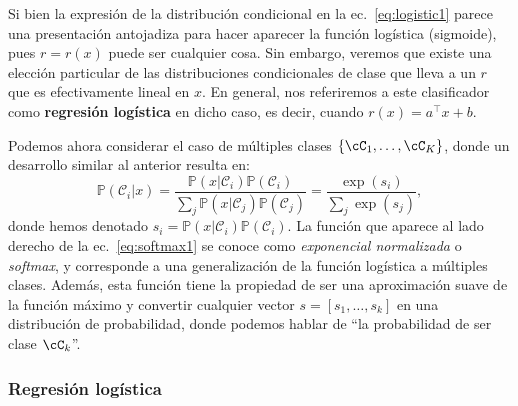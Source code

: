 \begin{remark} Si bien la expresión de la distribución condicional en la ec.~\eqref{eq:logistic1} parece una presentación antojadiza para hacer aparecer la  función logística (sigmoide), pues $r=r(x)$ puede ser cualquier cosa. Sin embargo, veremos que existe una elección particular de las distribuciones condicionales de clase que lleva a un $r$ que es efectivamente lineal en $x$. En general, nos  referiremos a este clasificador como \textbf{regresión logística} en dicho caso, es decir, cuando $r(x) = a^\top x  + b$.
\end{remark} 

Podemos ahora considerar el caso de múltiples clases $\{\cC_1,\ldots,\cC_K\}$, donde un desarrollo similar al anterior resulta en:  
\begin{equation}
	\mathbb{P}(\mathcal{C}_i | x) = \frac{\mathbb{P}(x | \mathcal{C}_i)\mathbb{P}(\mathcal{C}_i)}{\sum_{j}\mathbb{P}(x | \mathcal{C}_j)\mathbb{P}(\mathcal{C}_j)} = \frac{\exp(s_i)}{\sum_{j}\exp(s_j)},\label{eq:softmax1}  
\end{equation}
donde hemos denotado $s_i = \mathbb{P}(x | \mathcal{C}_i)\mathbb{P}(\mathcal{C}_i)$. La función que aparece al lado derecho de la  ec.~\eqref{eq:softmax1} se conoce como \emph{exponencial normalizada} o \emph{softmax}, y corresponde a una generalización de la función logística a múltiples clases. Además, esta función tiene la propiedad de ser una aproximación suave de la función máximo y convertir cualquier vector $s=[s_1,\ldots,s_k]$ en una distribución de probabilidad, donde podemos hablar de ``la probabilidad de ser clase $\cC_k$''.

\subsubsection{Regresión logística} 
\label{sub:reg_log}

